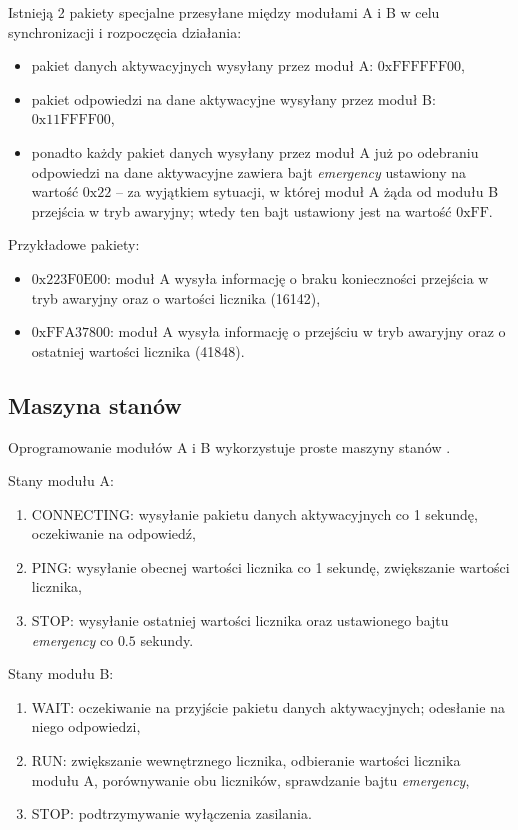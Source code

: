 Istnieją 2 pakiety specjalne przesyłane między modułami A i B w celu synchronizacji i rozpoczęcia działania:

\begin{itemize}
\item pakiet danych aktywacyjnych wysyłany przez moduł A: $0\mathrm{xFFFFFF}00$,
\item pakiet odpowiedzi na dane aktywacyjne wysyłany przez moduł B: $0\mathrm{x11FFFF}00$,
\item ponadto każdy pakiet danych wysyłany przez moduł A już po odebraniu odpowiedzi na dane aktywacyjne zawiera bajt \textit{emergency} ustawiony na wartość $0\mathrm{x}22$ -- za wyjątkiem sytuacji, w której moduł A żąda od modułu B przejścia w tryb awaryjny; wtedy ten bajt ustawiony jest na wartość $0\mathrm{xFF}$.
\end{itemize}

Przykładowe pakiety:

\begin{itemize}
\item $0\mathrm{x}223\mathrm{F}0\mathrm{E}00$: moduł A wysyła informację o braku konieczności przejścia w tryb awaryjny oraz o wartości licznika (16142),
\item $0\mathrm{xFFA}37800$: moduł A wysyła informację o przejściu w tryb awaryjny oraz o ostatniej wartości licznika (41848).
\end{itemize}

\subsection{Maszyna stanów}
\label{subsec:maszyna_stanow}

Oprogramowanie modułów A i B wykorzystuje proste maszyny stanów \cite{Bro69}.

Stany modułu A:

\begin{enumerate}
\item CONNECTING: wysyłanie pakietu danych aktywacyjnych co 1 sekundę, oczekiwanie na odpowiedź,
\item PING: wysyłanie obecnej wartości licznika co 1 sekundę, zwiększanie wartości licznika,
\item STOP: wysyłanie ostatniej wartości licznika oraz ustawionego bajtu \textit{emergency} co $0.5$ sekundy.
\end{enumerate}

Stany modułu B:

\begin{enumerate}
\item WAIT: oczekiwanie na przyjście pakietu danych aktywacyjnych; odesłanie na niego odpowiedzi,
\item RUN: zwiększanie wewnętrznego licznika, odbieranie wartości licznika modułu A, porównywanie obu liczników, sprawdzanie bajtu \textit{emergency},
\item STOP: podtrzymywanie wyłączenia zasilania.
\end{enumerate}

